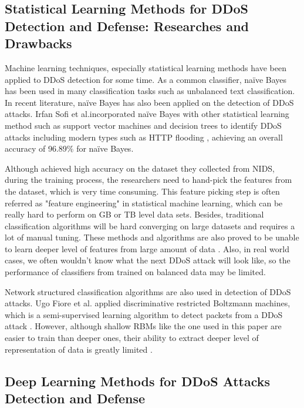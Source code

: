 \documentclass[paper=a4, fontsize=12pt]{scrartcl} %
\numberwithin{equation}{section} %
\numberwithin{figure}{section} %
\numberwithin{table}{section} %
\begin{document}
\subsection{Statistical Learning Methods for DDoS Detection and Defense: Researches and Drawbacks }

Machine learning techniques, especially statistical learning methods have been applied to DDoS detection for some time.  As a common classifier, naïve Bayes has been used in many classification tasks such as unbalanced text classification\cite{10.1007/11871637_49}. In recent literature, naïve Bayes has also been applied on the detection of DDoS attacks. Irfan Sofi et al.incorporated naïve Bayes with other statistical learning method such as support vector machines and decision trees to identify DDoS attacks including modern types such as HTTP flooding \cite{sofi_machine_nodate}, achieving an overall accuracy of 96.89$\%$ for naïve Bayes. 

Although achieved high accuracy on the dataset they collected from NIDS, during the training process, the researchers need to hand-pick the features from the dataset, which is very time consuming. This feature picking step is often referred as "feature engineering" in statistical machine learning, which can be really hard to perform on GB or TB level data sets. Besides, traditional classification algorithms will be hard converging on large datasets and requires a lot of manual tuning. These methods and algorithms are also proved to be unable to learn deeper level of features from large amount of data \cite{Goodfellow-et-al-2016}. Also, in real world cases, we often wouldn't know what the next DDoS attack will look like, so the performance of classifiers from trained on balanced data may be limited. 

Network structured classification algorithms are also used in detection of DDoS attacks. Ugo Fiore et al. applied discriminative restricted Boltzmann machines, which is a semi-supervised learning algorithm to detect packets from a DDoS attack \cite{fiore_network_2013}. However, although shallow RBMs like the one used in this paper are easier to train than deeper ones, their ability to extract deeper level of representation of data is greatly limited \cite{bishop:2006:PRML}. 

\subsection{Deep Learning Methods for DDoS Attacks Detection and Defense}
\end{document}
